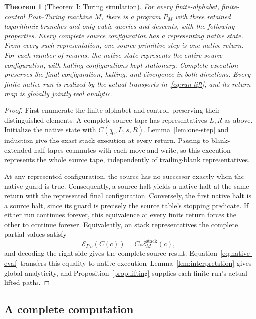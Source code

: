 \documentclass[11pt]{article}
\numberwithin{equation}{section}
\newtheorem{theorem}{Theorem}[section]
\theoremstyle{definition}
\theoremstyle{remark}
\begin{document}
\begin{theorem}[Theorem I: Turing simulation]\label{thm:universality}
For every finite-alphabet, finite-control Post--Turing machine $M$,
there is a program $P_M$ with three retained logarithmic branches and
only cubic queries and descents, with the following properties.
Every complete source configuration has a representing native state.
From every such representation, one source primitive step is one native
return. For each number of returns, the native state represents the
entire source configuration, with halting configurations kept stationary.
Complete execution preserves the final configuration, halting, and
divergence in both directions. Every finite native run is realized by
the actual transports in~\eqref{eq:run-lift}, and its return map is
globally jointly real analytic.
\end{theorem}
\begin{proof}
First enumerate the finite alphabet and control, preserving their
distinguished elements. A complete source tape has representatives
$L,R$ as above. Initialize the native state with $C(q_0,L,s,R)$.
Lemma~\ref{lem:one-step} and induction give the exact stack execution
at every return. Passing to blank-extended half-tapes commutes with
each move and write, so this execution represents the whole source
tape, independently of trailing-blank representatives.

At any represented configuration, the source has no successor exactly
when the native guard is true. Consequently, a source halt yields a
native halt at the same return with the represented final
configuration. Conversely, the first native halt is a source halt,
since its guard is precisely the source table's stopping predicate.
If either run continues forever, this equivalence at every finite
return forces the other to continue forever. Equivalently, on stack
representatives the complete partial values satisfy
\begin{equation}\label{eq:compiled-part}
 \mathcal E_{P_M}(C(c))=C_*\mathcal E_M^{\mathrm{stack}}(c),
\end{equation}
and decoding the right side gives the complete source result.
Equation~\eqref{eq:native-eval} transfers this equality to native
execution. Lemma~\ref{lem:interpretation} gives global analyticity,
and Proposition~\ref{prop:lifting} supplies each finite run's actual
lifted paths.
\end{proof}

\subsection{A complete computation}
\end{document}
